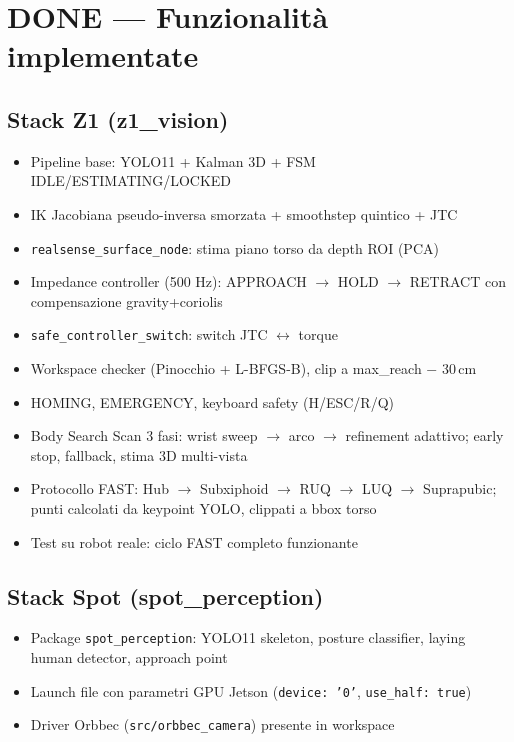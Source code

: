 \documentclass[a4paper,11pt]{article}
\begin{document}
\section{DONE — Funzionalità implementate}

\begin{donebox}
\subsection*{Stack Z1 (z1\_vision)}
\begin{itemize}[leftmargin=1.5em]
  \item[\checkmark] Pipeline base: YOLO11 + Kalman 3D + FSM IDLE/ESTIMATING/LOCKED
  \item[\checkmark] IK Jacobiana pseudo-inversa smorzata + smoothstep quintico + JTC
  \item[\checkmark] \texttt{realsense\_surface\_node}: stima piano torso da depth ROI (PCA)
  \item[\checkmark] Impedance controller (500 Hz): APPROACH $\to$ HOLD $\to$ RETRACT con
        compensazione gravity+coriolis
  \item[\checkmark] \texttt{safe\_controller\_switch}: switch JTC $\leftrightarrow$ torque
  \item[\checkmark] Workspace checker (Pinocchio + L-BFGS-B), clip a max\_reach $-$ 30\,cm
  \item[\checkmark] HOMING, EMERGENCY, keyboard safety (H/ESC/R/Q)
  \item[\checkmark] Body Search Scan 3 fasi: wrist sweep $\to$ arco $\to$ refinement adattivo;
        early stop, fallback, stima 3D multi-vista
  \item[\checkmark] Protocollo FAST: Hub $\to$ Subxiphoid $\to$ RUQ $\to$ LUQ $\to$ Suprapubic;
        punti calcolati da keypoint YOLO, clippati a bbox torso
  \item[\checkmark] Test su robot reale: ciclo FAST completo funzionante
\end{itemize}

\subsection*{Stack Spot (spot\_perception)}
\begin{itemize}[leftmargin=1.5em]
  \item[\checkmark] Package \texttt{spot\_perception}: YOLO11 skeleton, posture classifier,
        laying human detector, approach point
  \item[\checkmark] Launch file con parametri GPU Jetson (\texttt{device: '0'}, \texttt{use\_half: true})
  \item[\checkmark] Driver Orbbec (\texttt{src/orbbec\_camera}) presente in workspace
\end{itemize}


\end{donebox}
\end{document}
